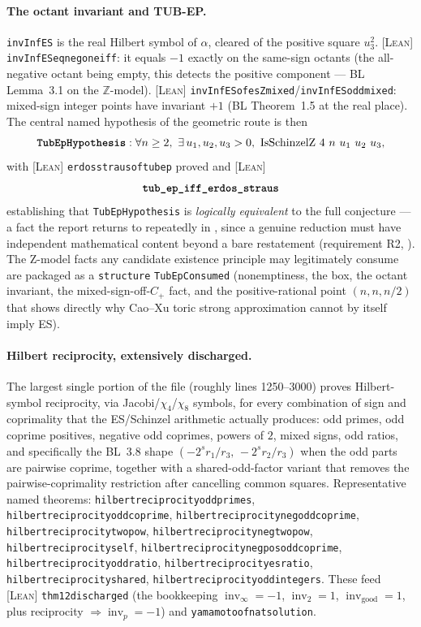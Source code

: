 \documentclass[11pt]{article}
\theoremstyle{plain}
\theoremstyle{definition}
\theoremstyle{remark}
\newcommand{\LEAN}{\textcolor{proved}{\textsc{[Lean]}}}
\newcommand{\lean}[1]{\texttt{#1}}
\renewcommand{\_}{\textunderscore\allowbreak}
\newcommand{\Z}{\mathbb{Z}}
\newcommand{\inv}{\operatorname{inv}}
\begin{document}
\paragraph{The octant invariant and TUB-EP.}
\lean{invInfES} is the real Hilbert symbol of $\alpha$, cleared of the positive square $u_3^2$.
\LEAN{} \lean{invInfES\_eq\_neg\_one\_iff}: it equals $-1$ exactly on the same-sign octants (the
all-negative octant being empty, this detects the positive component — BL Lemma~3.1 on the
$\Z$-model). \LEAN{} \lean{invInfES\_of\_esZ\_mixed}/\lean{invInfES\_odd\_mixed}: mixed-sign
integer points have invariant $+1$ (BL Theorem~1.5 at the real place). The central named
hypothesis of the geometric route is then
\[
\textbf{\lean{TubEpHypothesis}} : \forall n\ge 2,\ \exists\, u_1,u_2,u_3>0,\ \mathrm{IsSchinzelZ}\ 4\ n\ u_1\ u_2\ u_3,
\]
with \LEAN{} \lean{erdos\_straus\_of\_tub\_ep} proved and \LEAN{}
\[
\textbf{\lean{tub\_ep\_iff\_erdos\_straus}}
\]
establishing that \lean{TubEpHypothesis} is \emph{logically equivalent} to the full conjecture
— a fact the report returns to repeatedly in , since a genuine reduction must
have independent mathematical content beyond a bare restatement (requirement R2,
). The Z-model facts any candidate existence principle may legitimately consume
are packaged as a \lean{structure} \lean{TubEpConsumed} (nonemptiness, the box, the octant
invariant, the mixed-sign-off-$C_+$ fact, and the positive-rational point $(n,n,n/2)$ that shows
directly why Cao--Xu toric strong approximation cannot by itself imply ES).

\paragraph{Hilbert reciprocity, extensively discharged.}
The largest single portion of the file (roughly lines 1250--3000) proves Hilbert-symbol
reciprocity, via Jacobi/$\chi_4$/$\chi_8$ symbols, for every combination of sign and
coprimality that the ES/Schinzel arithmetic actually produces: odd primes, odd coprime
positives, negative odd coprimes, powers of $2$, mixed signs, odd ratios, and specifically the
BL~3.8 shape $(-2^s r_1/r_3,\,-2^s r_2/r_3)$ when the odd parts are pairwise coprime, together
with a shared-odd-factor variant that removes the pairwise-coprimality restriction after
cancelling common squares. Representative named theorems: \lean{hilbert\_reciprocity\_odd\_primes},
\lean{hilbert\_reciprocity\_odd\_coprime}, \lean{hilbert\_reciprocity\_neg\_odd\_coprime},
\lean{hilbert\_reciprocity\_two\_pow}, \lean{hilbert\_reciprocity\_neg\_two\_pow},
\lean{hilbert\_reciprocity\_self}, \lean{hilbert\_reciprocity\_neg\_pos\_odd\_coprime},
\lean{hilbert\_reciprocity\_odd\_ratio}, \lean{hilbert\_reciprocity\_es\_ratio},
\lean{hilbert\_reciprocity\_shared}, \lean{hilbert\_reciprocity\_odd\_integers}. These feed
\LEAN{} \lean{thm12\_discharged} (the bookkeeping $\inv_\infty=-1$, $\inv_2=1$,
$\inv_{\mathrm{good}}=1$, plus reciprocity $\Rightarrow \inv_p=-1$) and
\lean{yamamoto\_of\_nat\_solution}.
\end{document}

